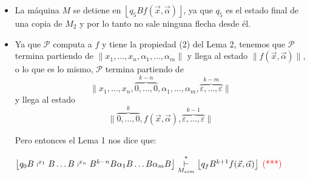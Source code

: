 \begin{frame}
  \begin{block}{}
    \begin{itemize}
      \item La máquina $M$ se detiene en $\left\lfloor q_{5} B f(\vec{x},\vec{\alpha}) \right\rfloor$, ya que $q_{5}$ es
        el estado final de una copia de $M_{2}$ y por lo tanto no sale ninguna flecha desde él.

      \item Ya que $\mathcal{P}$ computa a $f$ y tiene la propiedad (2) del Lema 2, tenemos que $\mathcal{P}$ termina
        partiendo de $\lVert x_{1}, \dotsc, x_{n}, \alpha_{1}, \dotsc, \alpha_{m} \rVert$ y llega al estado $\lVert
        f(\vec{x},\vec{\alpha}) \rVert$, o lo que es lo mismo, $\mathcal{P}$ termina partiendo de
        \begin{equation*}
          \lVert x_{1}, \dotsc, x_{n}, \overset{k-n}{\overbrace{0,\dotsc,0}}, \alpha_{1}, \dotsc, \alpha_{m},
          \overset{k-m}{\overbrace{\varepsilon,\dotsc,\varepsilon}} \rVert
        \end{equation*}
        \PN y llega al estado
        \begin{equation*}
          \lVert \overset{k}{\overbrace{0,\dotsc,0}}, f(\vec{x}, \vec{\alpha}), \overset{k-1}{\overbrace{\varepsilon,
          \dotsc,\varepsilon}} \rVert
        \end{equation*}

        \PN Pero entonces el Lema 1 nos dice que:
        \begin{center}
          $\left\lfloor q_{0}B\shortmid ^{x_{1}}B\dotsc B\shortmid
          ^{x_{n}}B^{k-n}B\alpha _{1}B\dotsc B\alpha _{m}B\right\rfloor \overset{\ast }{%
          \underset{M_{sim}}{\vdash }}\left\lfloor q_{f}B^{k+1}f(\vec{x},\vec{\alpha}%
          )\right\rfloor $ \textcolor{red}{(***)}
        \end{center}
    \end{itemize}
  \end{block}
\end{frame}
